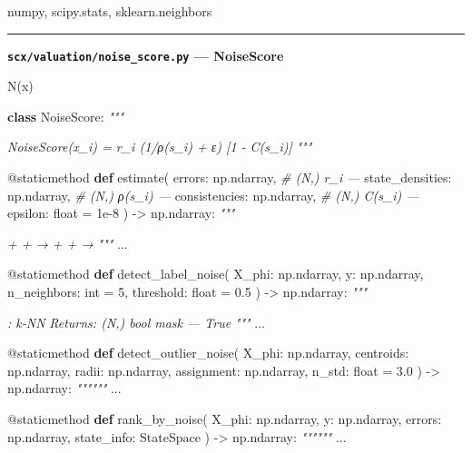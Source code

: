 \documentclass[
  12pt,
]{article}
\newenvironment{Shaded}{}{}
\newcommand{\AttributeTok}[1]{\textcolor[rgb]{0.49,0.56,0.16}{#1}}
\newcommand{\BuiltInTok}[1]{\textcolor[rgb]{0.00,0.50,0.00}{#1}}
\newcommand{\CommentTok}[1]{\textcolor[rgb]{0.38,0.63,0.69}{\textit{#1}}}
\newcommand{\DecValTok}[1]{\textcolor[rgb]{0.25,0.63,0.44}{#1}}
\newcommand{\FloatTok}[1]{\textcolor[rgb]{0.25,0.63,0.44}{#1}}
\newcommand{\KeywordTok}[1]{\textcolor[rgb]{0.00,0.44,0.13}{\textbf{#1}}}
\newcommand{\NormalTok}[1]{#1}
\newcommand{\OperatorTok}[1]{\textcolor[rgb]{0.40,0.40,0.40}{#1}}
\begin{document}
numpy, scipy.stats, sklearn.neighbors

\begin{center}\rule{0.5\linewidth}{0.5pt}\end{center}

\textbf{\texttt{scx/valuation/noise\_score.py} --- NoiseScore}

 N(x)

\begin{Shaded}
\begin{Highlighting}[]
\KeywordTok{class}\NormalTok{ NoiseScore:}
    \CommentTok{"""}

\CommentTok{    NoiseScore(x\_i) = r\_i  (1/ρ(s\_i) + ε)  [1 {-} C(s\_i)]}
\CommentTok{    """}

    \AttributeTok{@staticmethod}
    \KeywordTok{def}\NormalTok{ estimate(}
\NormalTok{        errors: np.ndarray,          }\CommentTok{\# (N,) r\_i — }
\NormalTok{        state\_densities: np.ndarray, }\CommentTok{\# (N,) ρ(s\_i) — }
\NormalTok{        consistencies: np.ndarray,   }\CommentTok{\# (N,) C(s\_i) — }
\NormalTok{        epsilon: }\BuiltInTok{float} \OperatorTok{=} \FloatTok{1e{-}8}
\NormalTok{    ) }\OperatorTok{{-}\textgreater{}}\NormalTok{ np.ndarray:}
        \CommentTok{"""}

\CommentTok{         +  +  → }
\CommentTok{         +  +  → }
\CommentTok{        """}
\NormalTok{        ...}

    \AttributeTok{@staticmethod}
    \KeywordTok{def}\NormalTok{ detect\_label\_noise(}
\NormalTok{        X\_phi: np.ndarray,}
\NormalTok{        y: np.ndarray,}
\NormalTok{        n\_neighbors: }\BuiltInTok{int} \OperatorTok{=} \DecValTok{5}\NormalTok{,}
\NormalTok{        threshold: }\BuiltInTok{float} \OperatorTok{=} \FloatTok{0.5}
\NormalTok{    ) }\OperatorTok{{-}\textgreater{}}\NormalTok{ np.ndarray:}
        \CommentTok{"""}

\CommentTok{        : k{-}NN }
\CommentTok{        Returns: (N,) bool mask — True }
\CommentTok{        """}
\NormalTok{        ...}

    \AttributeTok{@staticmethod}
    \KeywordTok{def}\NormalTok{ detect\_outlier\_noise(}
\NormalTok{        X\_phi: np.ndarray,}
\NormalTok{        centroids: np.ndarray,}
\NormalTok{        radii: np.ndarray,}
\NormalTok{        assignment: np.ndarray,}
\NormalTok{        n\_std: }\BuiltInTok{float} \OperatorTok{=} \FloatTok{3.0}
\NormalTok{    ) }\OperatorTok{{-}\textgreater{}}\NormalTok{ np.ndarray:}
        \CommentTok{""""""}
\NormalTok{        ...}

    \AttributeTok{@staticmethod}
    \KeywordTok{def}\NormalTok{ rank\_by\_noise(}
\NormalTok{        X\_phi: np.ndarray,}
\NormalTok{        y: np.ndarray,}
\NormalTok{        errors: np.ndarray,}
\NormalTok{        state\_info: StateSpace}
\NormalTok{    ) }\OperatorTok{{-}\textgreater{}}\NormalTok{ np.ndarray:}
        \CommentTok{""""""}
\NormalTok{        ...}
\end{Highlighting}
\end{Shaded}
\end{document}
